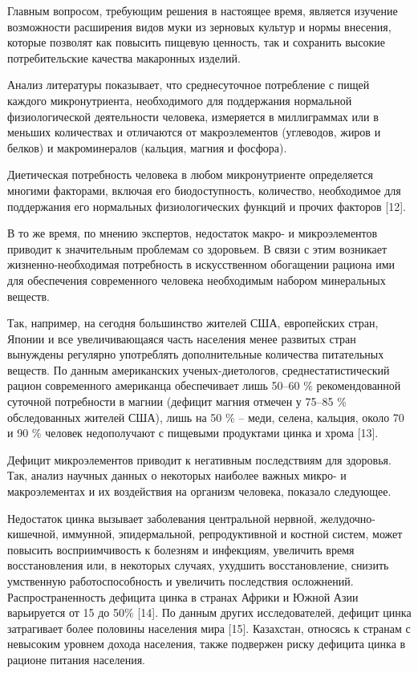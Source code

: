 Главным вопросом, требующим решения в настоящее время, является изучение
возможности расширения видов муки из зерновых культур и нормы внесения,
которые позволят как повысить пищевую ценность, так и сохранить высокие
потребительские качества макаронных изделий.

Анализ литературы показывает, что среднесуточное потребление с пищей
каждого микронутриента, необходимого для поддержания нормальной
физиологической деятельности человека, измеряется в миллиграммах или в
меньших количествах и отличаются от макроэлементов (углеводов, жиров и
белков) и макроминералов (кальция, магния и фосфора).

Диетическая потребность человека в любом микронутриенте определяется
многими факторами, включая его биодоступность, количество, необходимое
для поддержания его нормальных физиологических функций и прочих факторов
{[}12{]}.

В то же время, по мнению экспертов, недостаток макро- и микроэлементов
приводит к значительным проблемам со здоровьем. В связи с этим возникает
жизненно-необходимая потребность в искусственном обогащении рациона ими
для обеспечения современного человека необходимым набором минеральных
веществ.

Так, например, на сегодня большинство жителей США, европейских стран,
Японии и все увеличивающаяся часть населения менее развитых стран
вынуждены регулярно употреблять дополнительные количества питательных
веществ. По данным американских ученых-диетологов, среднестатистический
рацион современного американца обеспечивает лишь 50--60 \%
рекомендованной суточной потребности в магнии (дефицит магния отмечен у
75--85 \% обследованных жителей США), лишь на 50 \% -- меди, селена,
кальция, около 70 и 90 \% человек недополучают с пищевыми продуктами
цинка и хрома {[}13{]}.

Дефицит микроэлементов приводит к негативным последствиям для здоровья.
Так, анализ научных данных о некоторых наиболее важных микро- и
макроэлементах и их воздействия на организм человека, показало
следующее.

Недостаток цинка вызывает заболевания центральной нервной,
желудочно-кишечной, иммунной, эпидермальной, репродуктивной и костной
систем, может повысить восприимчивость к болезням и инфекциям, увеличить
время восстановления или, в некоторых случаях, ухудшить восстановление,
снизить умственную работоспособность и увеличить последствия осложнений.
Распространенность дефицита цинка в странах Африки и Южной Азии
варьируется от 15 до 50\% {[}14{]}. По данным других исследователей,
дефицит цинка затрагивает более половины населения мира {[}15{]}.
Казахстан, относясь к странам с невысоким уровнем дохода населения,
также подвержен риску дефицита цинка в рационе питания населения.

